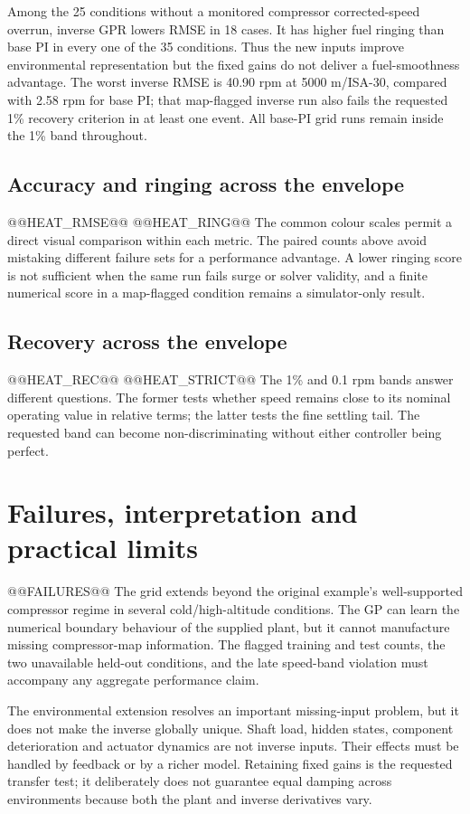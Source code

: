 Among the 25 conditions without a monitored compressor corrected-speed overrun, inverse GPR lowers RMSE in 18 cases. It has higher fuel ringing than base PI in every one of the 35 conditions. Thus the new inputs improve environmental representation but the fixed gains do not deliver a fuel-smoothness advantage. The worst inverse RMSE is 40.90 rpm at 5000 m/ISA-30, compared with 2.58 rpm for base PI; that map-flagged inverse run also fails the requested 1\% recovery criterion in at least one event. All base-PI grid runs remain inside the 1\% band throughout.

\clearpage
\subsection{Accuracy and ringing across the envelope}
@@HEAT_RMSE@@
@@HEAT_RING@@
The common colour scales permit a direct visual comparison within each metric. The paired counts above avoid mistaking different failure sets for a performance advantage. A lower ringing score is not sufficient when the same run fails surge or solver validity, and a finite numerical score in a map-flagged condition remains a simulator-only result.

\clearpage
\subsection{Recovery across the envelope}
@@HEAT_REC@@
@@HEAT_STRICT@@
The 1\% and 0.1 rpm bands answer different questions. The former tests whether speed remains close to its nominal operating value in relative terms; the latter tests the fine settling tail. The requested band can become non-discriminating without either controller being perfect.

\clearpage
\section{Failures, interpretation and practical limits}
@@FAILURES@@
The grid extends beyond the original example's well-supported compressor regime in several cold/high-altitude conditions. The GP can learn the numerical boundary behaviour of the supplied plant, but it cannot manufacture missing compressor-map information. The flagged training and test counts, the two unavailable held-out conditions, and the late speed-band violation must accompany any aggregate performance claim.

The environmental extension resolves an important missing-input problem, but it does not make the inverse globally unique. Shaft load, hidden states, component deterioration and actuator dynamics are not inverse inputs. Their effects must be handled by feedback or by a richer model. Retaining fixed gains is the requested transfer test; it deliberately does not guarantee equal damping across environments because both the plant and inverse derivatives vary.

